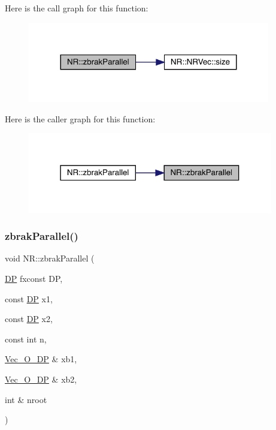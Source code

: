 Here is the call graph for this function\+:
\nopagebreak
\begin{figure}[H]
\begin{center}
\leavevmode
\includegraphics[width=300pt]{da/d46/namespaceNR_a2cabd01c9ff7c4250cefe4cb1d545f49_cgraph}
\end{center}
\end{figure}
Here is the caller graph for this function\+:
\nopagebreak
\begin{figure}[H]
\begin{center}
\leavevmode
\includegraphics[width=304pt]{da/d46/namespaceNR_a2cabd01c9ff7c4250cefe4cb1d545f49_icgraph}
\end{center}
\end{figure}
\mbox{\label{namespaceNR_aca7c15b9ebf8da85b483508c7352938f}} 
\subsubsection{\texorpdfstring{zbrakParallel()}{zbrakParallel()}\hspace{0.1cm}{\footnotesize\ttfamily [2/2]}}
{\footnotesize\ttfamily void N\+R\+::zbrak\+Parallel (\begin{DoxyParamCaption}\item[{\mbox{\hyperlink{namespaceNR_af6ff762dd605ff477b8e52387253a02a}{DP}} }]{fxconst DP,  }\item[{const \mbox{\hyperlink{namespaceNR_af6ff762dd605ff477b8e52387253a02a}{DP}}}]{x1,  }\item[{const \mbox{\hyperlink{namespaceNR_af6ff762dd605ff477b8e52387253a02a}{DP}}}]{x2,  }\item[{const int}]{n,  }\item[{\mbox{\hyperlink{namespaceNR_a970094d23441f8ef6a45282a7eb2103d}{Vec\+\_\+\+O\+\_\+\+DP}} \&}]{xb1,  }\item[{\mbox{\hyperlink{namespaceNR_a970094d23441f8ef6a45282a7eb2103d}{Vec\+\_\+\+O\+\_\+\+DP}} \&}]{xb2,  }\item[{int \&}]{nroot }\end{DoxyParamCaption})}

